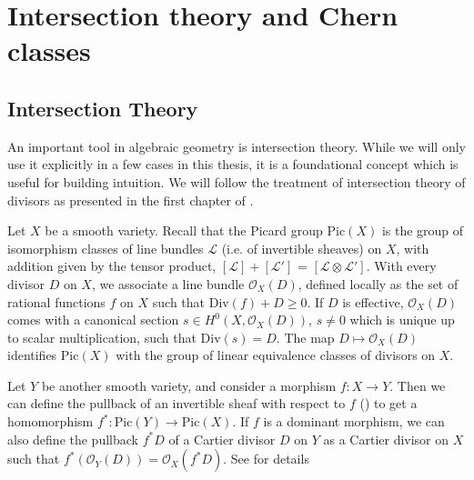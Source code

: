\chapter{Intersection theory and Chern classes}
\label{chern}

\section{Intersection Theory}

An important tool in algebraic geometry is intersection theory. While we will only use it explicitly in a few cases in this thesis, it is a foundational concept which is useful for building intuition. We will follow the treatment of intersection theory of divisors as presented in the first chapter of \cite{BEA96}.


Let $X$ be a smooth variety.  Recall that the Picard group $\mathrm{Pic}(X)$ is the group of isomorphism classes of line bundles $\mathcal{L}$ (i.e. of invertible sheaves) on $X$, with addition given by the tensor product, $[\mathcal{L}] + [\mathcal{L'}]$ = $[\mathcal{L} \otimes \mathcal{L'}]$. With every divisor $D$ on $X$, we associate a line bundle $\mathcal{O}_X(D)$, defined locally as the set of rational functions $f$ on $X$ such that $\text{Div}(f) + D \geq 0$. If $D$ is effective, $\mathcal{O}_X(D)$ comes with a canonical section $s \in H^0(X, \mathcal{O}_X(D))$, $s \neq 0$ which is unique up to scalar multiplication, such that $\mathrm{Div}(s) = D$. The map $D \mapsto \mathcal{O}_X(D)$ identifies $\mathrm{Pic}(X)$ with the group of linear equivalence classes of divisors on $X$. 


Let $Y$ be another smooth variety, and consider a morphism $f\colon X \to Y$. Then we can define the pullback of an invertible sheaf with respect to $f$ (\cite[Section 16.5]{EO25}) to get a homomorphism $f^* \colon \mathrm{Pic}(Y) \to \mathrm{Pic}(X)$. If $f$ is a dominant morphism, we can also define the pullback $f^*D$ of a Cartier divisor $D$ on $Y$ as a Cartier divisor on $X$ such that $f^*(\mathcal{O}_Y(D)) = \mathcal{O}_X(f^*D)$. See \cite[Section 20.7]{EO25} for details

